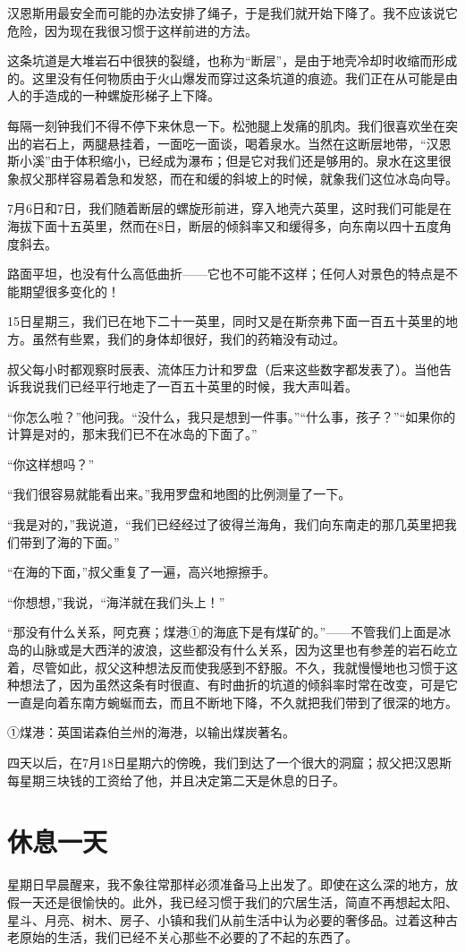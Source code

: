 \documentclass[10pt]{book}
\begin{document}
汉恩斯用最安全而可能的办法安排了绳子，于是我们就开始下降了。我不应该说它危险，因为现在我很习惯于这样前进的方法。

这条坑道是大堆岩石中很狭的裂缝，也称为“断层”，是由于地壳冷却时收缩而形成的。这里没有任何物质由于火山爆发而穿过这条坑道的痕迹。我们正在从可能是由人的手造成的一种螺旋形梯子上下降。

每隔一刻钟我们不得不停下来休息一下。松弛腿上发痛的肌肉。我们很喜欢坐在突出的岩石上，两腿悬挂着，一面吃一面谈，喝着泉水。当然在这断层地带，“汉恩斯小溪”由于体积缩小，已经成为瀑布；但是它对我们还是够用的。泉水在这里很象叔父那样容易着急和发怒，而在和缓的斜坡上的时候，就象我们这位冰岛向导。

7月6日和7日，我们随着断层的螺旋形前进，穿入地壳六英里，这时我们可能是在海拔下面十五英里，然而在8日，断层的倾斜率又和缓得多，向东南以四十五度角度斜去。

路面平坦，也没有什么高低曲折——它也不可能不这样；任何人对景色的特点是不能期望很多变化的！

15日星期三，我们已在地下二十一英里，同时又是在斯奈弗下面一百五十英里的地方。虽然有些累，我们的身体却很好，我们的药箱没有动过。

叔父每小时都观察时辰表、流体压力计和罗盘（后来这些数字都发表了）。当他告诉我说我们已经平行地走了一百五十英里的时候，我大声叫着。

“你怎么啦？”他问我。“没什么，我只是想到一件事。”“什么事，孩子？”“如果你的计算是对的，那末我们已不在冰岛的下面了。”

“你这样想吗？”

“我们很容易就能看出来。”我用罗盘和地图的比例测量了一下。

“我是对的，”我说道，“我们已经经过了彼得兰海角，我们向东南走的那几英里把我们带到了海的下面。”

“在海的下面，”叔父重复了一遍，高兴地擦擦手。

“你想想，”我说，“海洋就在我们头上！”

“那没有什么关系，阿克赛；煤港①的海底下是有煤矿的。”——不管我们上面是冰岛的山脉或是大西洋的波浪，这些都没有什么关系，因为这里也有参差的岩石屹立着，尽管如此，叔父这种想法反而使我感到不舒服。不久，我就慢慢地也习惯于这种想法了，因为虽然这条有时很直、有时曲折的坑道的倾斜率时常在改变，可是它一直是向着东南方蜿蜒而去，而且不断地下降，不久就把我们带到了很深的地方。

①煤港：英国诺森伯兰州的海港，以输出煤炭著名。

四天以后，在7月18日星期六的傍晚，我们到达了一个很大的洞窟；叔父把汉恩斯每星期三块钱的工资给了他，并且决定第二天是休息的日子。
\chapter{休息一天}
星期日早晨醒来，我不象往常那样必须准备马上出发了。即使在这么深的地方，放假一天还是很愉快的。此外，我已经习惯于我们的穴居生活，简直不再想起太阳、星斗、月亮、树木、房子、小镇和我们从前生活中认为必要的奢侈品。过着这种古老原始的生活，我们已经不关心那些不必要的了不起的东西了。
\end{document}
